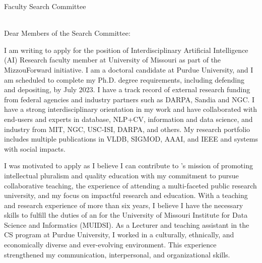 \documentclass[11pt]{article}
\begin{document}
\thispagestyle{plain}

\pagestyle{empty}

Faculty Search Committee \\
\InstitutionName \\
\DepartmentAddress

Dear Members of the Search Committee:

I am writing to apply for the position of Interdisciplinary Artificial Intelligence (AI) Research faculty member at University of Missouri as part of the MizzouForward initiative.
I am a doctoral candidate at Purdue University, and I am scheduled to complete my Ph.D. degree requirements, including defending and depositing, by July 2023. I have a track record of external research funding from federal agencies and industry partners such as DARPA, Sandia and NGC. I have a strong interdisciplinary orientation in my work and have collaborated with end-users and experts in database, NLP+CV, information and data science, and industry from MIT, NGC, USC-ISI, DARPA, and others. My research portfolio includes multiple publications in VLDB, SIGMOD, AAAI, and IEEE and systems with social impacts.

I was motivated to apply 
as I believe I can contribute to \shortInstitutionName{}'s mission of promoting intellectual pluralism 
and quality
education with my commitment to pursue collaborative teaching, the experience of attending a multi-faceted public research university, and my focus on impactful research and education.  With a teaching and research experience of more than six years, I believe I have the necessary skills to fulfill the duties of an \PositionName{} for the University of Missouri Institute for Data Science and Informatics (MUIDSI). %
As a Lecturer and teaching assistant in the CS program at Purdue University, I worked in a culturally, ethnically, and economically diverse and ever-evolving environment. This experience strengthened my communication, interpersonal, and organizational skills. 
\end{document}
